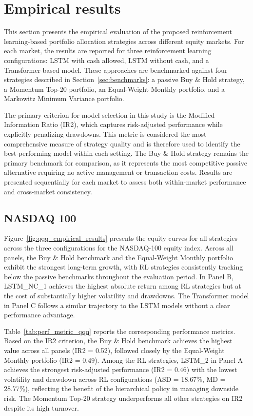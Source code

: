 \documentclass[]{elsarticle}
\begin{document}
\linespread{1.5}\selectfont

\hypertarget{empirical_results}{%
\section{Empirical results}\label{empirical_results}}

This section presents the empirical evaluation of the proposed reinforcement learning-based portfolio allocation strategies across different equity markets. For each market, the results are reported for three reinforcement learning configurations: LSTM with cash allowed, LSTM without cash, and a Transformer-based model. These approaches are benchmarked against four strategies described in Section~\ref{sec:benchmarks}: a passive Buy \& Hold strategy, a Momentum Top-20 portfolio, an Equal-Weight Monthly portfolio, and a Markowitz Minimum Variance portfolio.

The primary criterion for model selection in this study is the Modified Information Ratio (IR2), which captures risk-adjusted performance while explicitly penalizing drawdowns. This metric is considered the most comprehensive measure of strategy quality and is therefore used to identify the best-performing model within each setting. The Buy \& Hold strategy remains the primary benchmark for comparison, as it represents the most competitive passive alternative requiring no active management or transaction costs. Results are presented sequentially for each market to assess both within-market performance and cross-market consistency.

\hypertarget{er_QQQ}{%
\subsection{NASDAQ 100}\label{er_QQQ}}

Figure~\ref{fig:qqq_empirical_results} presents the equity curves for all strategies across the three configurations for the NASDAQ-100 equity index. Across all panels, the Buy \& Hold benchmark and the Equal-Weight Monthly portfolio exhibit the strongest long-term growth, with RL strategies consistently tracking below the passive benchmarks throughout the evaluation period. In Panel B, LSTM\_NC\_1 achieves the highest absolute return among RL strategies but at the cost of substantially higher volatility and drawdowns. The Transformer model in Panel C follows a similar trajectory to the LSTM models without a clear performance advantage.

Table~\ref{tab:perf_metric_qqq} reports the corresponding performance metrics. Based on the IR2 criterion, the Buy \& Hold benchmark achieves the highest value across all panels (IR2 = 0.52), followed closely by the Equal-Weight Monthly portfolio (IR2 = 0.49). Among the RL strategies, LSTM\_2 in Panel A achieves the strongest risk-adjusted performance (IR2 = 0.46) with the lowest volatility and drawdown across RL configurations (ASD = 18.67\%, MD = 28.77\%), reflecting the benefit of the hierarchical policy in managing downside risk. The Momentum Top-20 strategy underperforms all other strategies on IR2 despite its high turnover.
\end{document}
